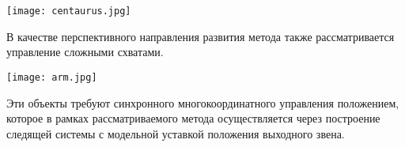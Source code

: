 \begin{center}
  \texttt{[image: centaurus.jpg]}
  \label{}
\end{center}

В качестве перспективного направления развития метода также рассматривается управление сложными схватами.

\begin{center}
  \texttt{[image: arm.jpg]}
  \label{}
\end{center}

Эти объекты требуют синхронного многокоординатного управления положением, которое в рамках рассматриваемого метода осуществляется через построение следящей системы с модельной уставкой положения выходного звена.

